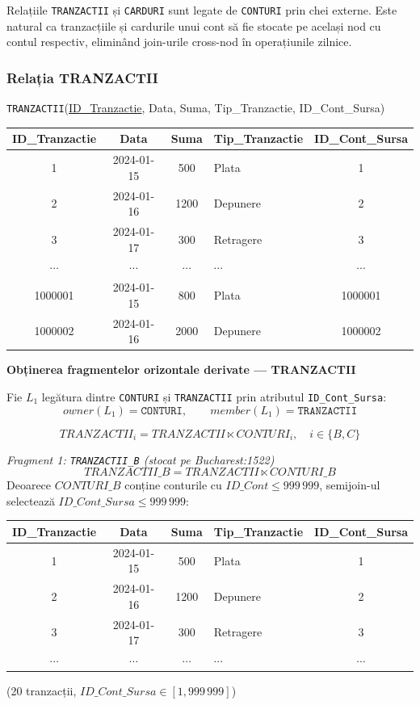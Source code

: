 \documentclass[12pt,a4paper]{article}
\begin{document}
Relațiile \texttt{TRANZACTII} și \texttt{CARDURI} sunt legate de \texttt{CONTURI} prin chei externe.
Este natural ca tranzacțiile și cardurile unui cont să fie stocate pe același nod cu contul respectiv,
eliminând join-urile cross-nod în operațiunile zilnice.

\subsubsection*{Relația TRANZACTII}

\texttt{TRANZACTII}(\underline{ID\_Tranzactie}, Data, Suma, Tip\_Tranzactie, ID\_Cont\_Sursa)

\begin{center}
\small
\begin{tabular}{c|c|c|l|c}
\toprule
ID\_Tranzactie & Data & Suma & Tip\_Tranzactie & ID\_Cont\_Sursa \\
\midrule
1       & 2024-01-15 &  500 & Plata     & 1 \\
2       & 2024-01-16 & 1200 & Depunere  & 2 \\
3       & 2024-01-17 &  300 & Retragere & 3 \\
$\cdots$ & $\cdots$ & $\cdots$ & $\cdots$ & $\cdots$ \\
1000001 & 2024-01-15 &  800 & Plata     & 1000001 \\
1000002 & 2024-01-16 & 2000 & Depunere  & 1000002 \\
\bottomrule
\end{tabular}
\end{center}

\textbf{Obținerea fragmentelor orizontale derivate — TRANZACTII}

Fie $L_1$ legătura dintre \texttt{CONTURI} și \texttt{TRANZACTII} prin atributul \texttt{ID\_Cont\_Sursa}:
\[
  owner(L_1) = \texttt{CONTURI}, \qquad member(L_1) = \texttt{TRANZACTII}
\]

\[
  TRANZACTII_i = TRANZACTII \ltimes CONTURI_i, \quad i \in \{B, C\}
\]

\textit{Fragment 1: \texttt{TRANZACTII\_B} (stocat pe Bucharest:1522)}
\[ TRANZACTII\_B = TRANZACTII \ltimes CONTURI\_B \]
Deoarece $CONTURI\_B$ conține conturile cu $ID\_Cont \leq 999\,999$, semijoin-ul selectează
$ID\_Cont\_Sursa \leq 999\,999$:

\begin{center}
\small
\begin{tabular}{c|c|c|l|c}
\toprule
ID\_Tranzactie & Data & Suma & Tip\_Tranzactie & ID\_Cont\_Sursa \\
\midrule
1 & 2024-01-15 &  500 & Plata     & 1 \\
2 & 2024-01-16 & 1200 & Depunere  & 2 \\
3 & 2024-01-17 &  300 & Retragere & 3 \\
$\cdots$ & $\cdots$ & $\cdots$ & $\cdots$ & $\cdots$ \\
\bottomrule
\end{tabular}
\end{center}
(20 tranzacții, $ID\_Cont\_Sursa \in [1, 999\,999]$)
\end{document}
